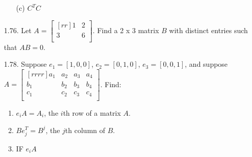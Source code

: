 \documentclass[12pt]{article}
\begin{document}
\begin{enumerate}
\begin{enumerate}
	\item[(c)] $C^T C$
	\end{enumerate}
\item[1.76.] Let $A=\begin{bmatrix}[rr] 1 & 2\\ 3 & 6\\ \end{bmatrix}$.
	Find a 2 x 3 matrix $B$ with distinct entries such that $AB = 0$.
\item[1.78.] Suppose $e_1=[1,0,0]$, $e_2=[0,1,0]$, $e_3=[0,0,1]$, and suppose $A=
\begin{bmatrix}[rrrr]
a_1 & a_2 & a_3 & a_4\\
b_1 & b_2 & b_3 & b_4\\
c_1 & c_2 & c_3 & c_4\\
\end{bmatrix}$. Find:
	\begin{enumerate}
	\item $e_iA=A_i$, the $i$th row of a matrix $A$.
	\item $Be_j^T=B^j$, the $j$th column of $B$.
	\item IF $e_iA$
	\end{enumerate}
\end{enumerate}
\end{document}
